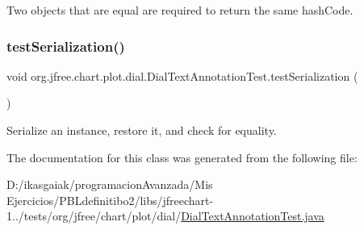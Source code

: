 Two objects that are equal are required to return the same hash\+Code. \mbox{\label{classorg_1_1jfree_1_1chart_1_1plot_1_1dial_1_1_dial_text_annotation_test_a1591e23af6ad32fff0292d2abf84c4af}} 
\subsubsection{\texorpdfstring{test\+Serialization()}{testSerialization()}}
{\footnotesize\ttfamily void org.\+jfree.\+chart.\+plot.\+dial.\+Dial\+Text\+Annotation\+Test.\+test\+Serialization (\begin{DoxyParamCaption}{ }\end{DoxyParamCaption})}

Serialize an instance, restore it, and check for equality. 

The documentation for this class was generated from the following file\+:\begin{DoxyCompactItemize}
\item 
D\+:/ikasgaiak/programacion\+Avanzada/\+Mis Ejercicios/\+P\+B\+Ldefinitibo2/libs/jfreechart-\/1../tests/org/jfree/chart/plot/dial/\mbox{\hyperlink{_dial_text_annotation_test_8java}{Dial\+Text\+Annotation\+Test.\+java}}\end{DoxyCompactItemize}
